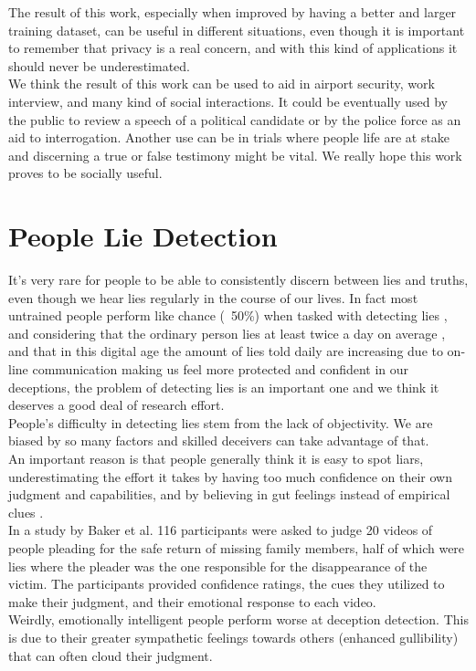 The result of this work, especially when improved by having a better and larger training dataset, can be useful in different situations, even though it is important to remember that privacy is a real concern, and with this kind of applications it should never be underestimated.\\
We think the result of this work can be used to aid in airport security, work interview, and many kind of social interactions. It could be eventually used by the public to review a speech of a political candidate or by the police force as an aid to interrogation. Another use can be in trials where people life are at stake and discerning a true or false testimony might be vital. We really hope this work proves to be socially useful.

\pagebreak

\section{People Lie Detection} \label{pplLieDet}
It's very rare for people to be able to consistently discern between lies and truths, even though we hear lies regularly in the course of our lives. In fact most untrained people perform like chance (~50\%) when tasked with detecting lies \cite{Porter2012SecretsAL}, and considering that the ordinary person lies at least twice a day on average \cite{LyingEverydayLife}, and that in this digital age the amount of lies told daily are increasing \cite{DigitalDeception} due to on-line communication making us feel more protected and confident in our deceptions, the problem of detecting lies is an important one and we think it deserves a good deal of research effort. \\

People's difficulty in detecting lies stem from the lack of objectivity. We are biased by so many factors and skilled deceivers can take advantage of that. \\
An important reason is that people generally think it is easy to spot liars, underestimating the effort it takes by having too much confidence on their own judgment and capabilities, and by believing in gut feelings instead of empirical clues \cite{VrijDLD}. \\

In a study by Baker et al.  \cite{EmotionallyIntelligent} 116 participants were asked to judge 20 videos of people pleading for the safe return of missing family members, half of which were lies where the pleader was the one responsible for the disappearance of the victim. The participants provided confidence ratings, the cues they utilized to make their judgment, and their emotional response to each video.\\
Weirdly, emotionally intelligent people perform worse at deception detection. This is due to their greater sympathetic feelings towards others (enhanced gullibility) that can often cloud their judgment.\\

